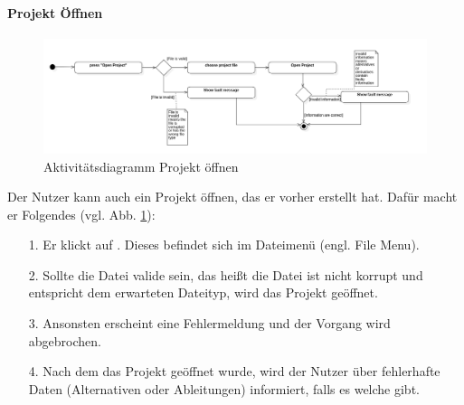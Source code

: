 \documentclass{article}
\newcommand{\guibutton}[1]{\fbox{\texttt{#1}}}
\begin{document}
\paragraph{Projekt Öffnen}\mbox{}
\begin{figure}[H]%
    \centering
    \includegraphics[width=13cm]{entwurf/Entwurf_dokument/img/Alissa/OpenProjectAD.png}
    \caption{Aktivitätsdiagramm Projekt öffnen}
    \label{ADProjektÖffnen}
\end{figure}
Der Nutzer kann auch ein Projekt öffnen, das er vorher erstellt hat. Dafür macht er Folgendes (vgl. Abb. \ref{ADProjektÖffnen}):
\begin{enumerate}
    \item[1.] Er klickt auf \guibutton{Open Project}. Dieses befindet sich im Dateimenü (engl. File Menu).
    \item[2.] Sollte die Datei valide sein, das heißt die Datei ist nicht korrupt und entspricht dem erwarteten Dateityp, wird das Projekt geöffnet.
    \item[3.] Ansonsten erscheint eine Fehlermeldung und der Vorgang wird abgebrochen.
    \item[4.] Nach dem das Projekt geöffnet wurde, wird der Nutzer über fehlerhafte Daten (Alternativen oder Ableitungen) informiert, falls es welche gibt. 
\end{enumerate}
\end{document}
